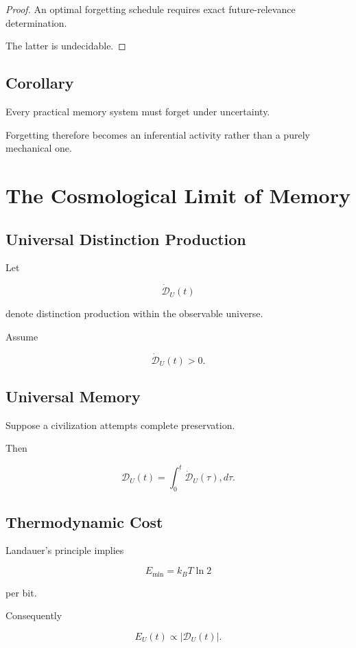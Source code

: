 \documentclass[12pt,oneside]{book}
\theoremstyle{plain} \newtheorem{theorem}{Theorem}[chapter] \newtheorem{lemma}[theorem]{Lemma} \newtheorem{proposition}[theorem]{Proposition} \newtheorem{corollary}[theorem]{Corollary}
\theoremstyle{definition} \newtheorem{definition}[theorem]{Definition} \newtheorem{axiom}[theorem]{Axiom} \newtheorem{construction}[theorem]{Construction}
\theoremstyle{remark} \newtheorem{remark}[theorem]{Remark} \newtheorem{example}[theorem]{Example}
\newcommand{\D}{\mathcal{D}} \newcommand{\R}{\mathcal{R}} \newcommand{\F}{\mathcal{F}} \newcommand{\U}{\mathcal{U}} \newcommand{\M}{\mathcal{M}} \newcommand{\G}{\Gamma}
\begin{document}
\begin{proof}

An optimal forgetting schedule requires exact future-relevance determination.

The latter is undecidable.

\end{proof}

\section{Corollary}

Every practical memory system must forget under uncertainty.

Forgetting therefore becomes an inferential activity rather than a purely mechanical one.

\chapter{The Cosmological Limit of Memory}

\section{Universal Distinction Production}

Let

\[
\dot{\D}_U(t)
\]

denote distinction production within the observable universe.

Assume

\[
\dot{\D}_U(t)>0.
\]

\section{Universal Memory}

Suppose a civilization attempts complete preservation.

Then

\[
\D_U(t)
=
\int_0^t
\dot{\D}_U(\tau)
,d\tau.
\]

\section{Thermodynamic Cost}

Landauer's principle implies

\[
E_{\min}
=
k_B T \ln 2
\]

per bit.

Consequently

\[
E_U(t)
\propto
|\D_U(t)|.
\]
\end{document}
